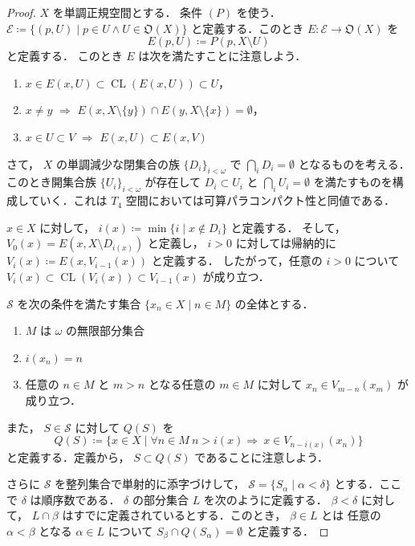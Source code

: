 \documentclass[leqno, 12pt]{ltjsarticle}
\newcommand{\To}{\Longrightarrow}
\newcommand{\OpenSets}[1]{\mathfrak{O}(#1)}
\DeclareMathOperator{\cl}{CL}
\begin{document}
\begin{proof}
$X$
を単調正規空間とする．
条件
$(P)$
を使う．
$\mathcal{E}\coloneqq\{(p, U) \mid p\in U\land U\in \OpenSets{X}\}$
と定義する．このとき
$E:\mathcal{E}\to \OpenSets{X}$
を
\[
E(p, U)\coloneqq P(p, X\setminus U)
\]
と定義する．
このとき
$E$
は次を満たすことに注意しよう．
\begin{enumerate}[label=\textup{(\arabic*)}]
\item
$x\in E(x,U)\subset \cl(E(x,U))\subset U$，
\item
$x\neq y$
$\To$
$E(x, X\setminus \{y\})\cap E(y, X\setminus \{x\})=\emptyset$，
\item
$x\in U\subset V$
$\To $
$E(x, U)\subset E(x, V)$
\end{enumerate}

さて，
$X$
の単調減少な閉集合の族
$\{D_{i}\}_{i<\omega}$
で
$\bigcap_{i}D_{i}=\emptyset$
となるものを考える．
このとき開集合族
$\{U_{i}\}_{i<\omega}$
が存在して
$D_{i}\subset U_{i}$
と
$\bigcap_{i}U_{i}=\emptyset$
を満たすものを構成していく．これは
$T_{4}$
空間においては可算パラコンパクト性と同値である．

$x\in X$
に対して，
$i(x)\coloneqq\min\{i \mid x\notin D_{i}\}$
と定義する．
そして，
$V_{0}(x)=E(x, X\setminus D_{i(x)})$
と定義し，
$i>0$
に対しては帰納的に
$V_{i}(x)\coloneqq E(x, V_{i-1}(x))$
と定義する．
したがって，任意の
$i>0$
について
$V_{i}(x)\subset\cl(V_{i}(x))\subset V_{i-1}(x)$
が成り立つ．

$\mathcal{S}$
を次の条件を満たす集合
$\{x_{n}\in X \mid n\in M\}$
の全体とする．
\begin{enumerate}[label=\textup{(\arabic*)}]
\item
$M$
は
$\omega$
の無限部分集合
\item
$i(x_{n})=n$
\item 任意の
$n\in M$
と
$m>n$
となる任意の
$m\in M$
に対して
$x_{n}\in V_{m-n}(x_{m})$
が成り立つ．
\end{enumerate}
また，
$S\in \mathcal{S}$
に対して
$Q(S)$
を
\[
Q(S)\coloneqq\{x\in X \mid \forall n\in M\ n>i(x)\To\ x\in V_{n-i(x)}(x_{n})\}
\]
と定義する．定義から，
$S\subset Q(S)$
であることに注意しよう．

さらに
$\mathcal{S}$
を整列集合で単射的に添字づけして，
$\mathcal{S}=\{S_{\alpha} \mid \alpha<\delta\}$
とする．ここで
$\delta$
は順序数である．
$\delta$
の部分集合
$L$
を次のように定義する．
$\beta<\delta$
に対して，
$L\cap \beta$
はすでに定義されているとする．このとき，
$\beta\in L$
とは
任意の
$\alpha<\beta$
となる
$\alpha\in L$
について
$S_{\beta}\cap Q(S_{\alpha})=\emptyset$
と定義する．


\end{proof}
\end{document}
